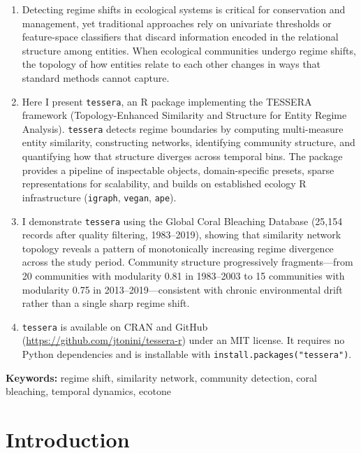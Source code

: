 \documentclass[12pt]{article}
\begin{document}
\begin{enumerate}
\item Detecting regime shifts in ecological systems is critical for conservation and management, yet traditional approaches rely on univariate thresholds or feature-space classifiers that discard information encoded in the relational structure among entities. When ecological communities undergo regime shifts, the topology of how entities relate to each other changes in ways that standard methods cannot capture.

\item Here I present \texttt{tessera}, an R package implementing the TESSERA framework (Topology-Enhanced Similarity and Structure for Entity Regime Analysis). \texttt{tessera} detects regime boundaries by computing multi-measure entity similarity, constructing networks, identifying community structure, and quantifying how that structure diverges across temporal bins. The package provides a pipeline of inspectable objects, domain-specific presets, sparse representations for scalability, and builds on established ecology R infrastructure (\texttt{igraph}, \texttt{vegan}, \texttt{ape}).

\item I demonstrate \texttt{tessera} using the Global Coral Bleaching Database (25,154 records after quality filtering, 1983--2019), showing that similarity network topology reveals a pattern of monotonically increasing regime divergence across the study period. Community structure progressively fragments---from 20 communities with modularity 0.81 in 1983--2003 to 15 communities with modularity 0.75 in 2013--2019---consistent with chronic environmental drift rather than a single sharp regime shift.

\item \texttt{tessera} is available on CRAN and GitHub (\url{https://github.com/jtonini/tessera-r}) under an MIT license. It requires no Python dependencies and is installable with \texttt{install.packages("tessera")}.
\end{enumerate}

\noindent\textbf{Keywords:} regime shift, similarity network, community detection, coral bleaching, temporal dynamics, ecotone

\newpage

\section{Introduction}
\end{document}
